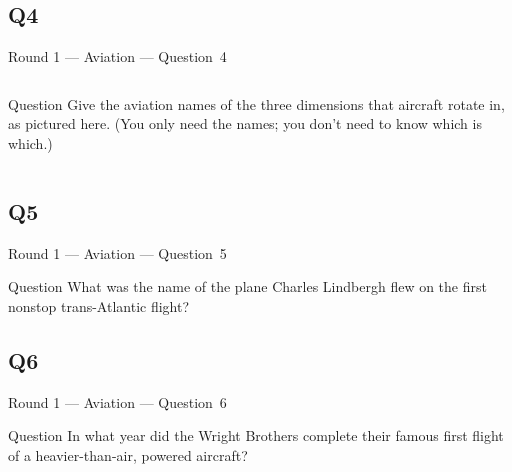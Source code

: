 \documentclass[11pt]{beamer}
\begin{document}
\subsection*{Q4}
\begin{frame}[t]{Round 1 --- Aviation --- \mbox{Question 4}}
\vspace{-0.5em}
\begin{columns}[T,totalwidth=\linewidth]
\begin{column}{0.32\linewidth}
\begin{block}{Question}
Give the aviation names of the three dimensions that aircraft rotate in, as pictured here. (You only need the names; you don't need to know which is which.)
\end{block}
\end{column}
\begin{column}{0.65\linewidth}
\begin{center}
\texttt{[image: \{Images/rollpitchyaw]}.png}
\end{center}
\end{column}
\end{columns}
\end{frame}
\subsection*{Q5}
\begin{frame}[t]{Round 1 --- Aviation --- \mbox{Question 5}}
\vspace{-0.5em}
\begin{block}{Question}
What was the name of the plane Charles Lindbergh flew on the first nonstop trans-Atlantic flight?
\end{block}
\end{frame}
\subsection*{Q6}
\begin{frame}[t]{Round 1 --- Aviation --- \mbox{Question 6}}
\vspace{-0.5em}
\begin{block}{Question}
In what year did the Wright Brothers complete their famous first flight of a heavier-than-air, powered aircraft?
\end{block}
\end{frame}
\end{document}
